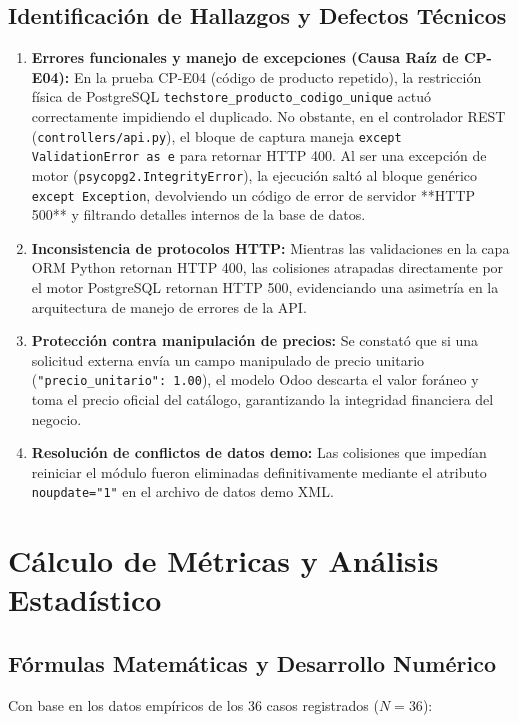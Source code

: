 \documentclass{article}
\begin{document}
\subsection{Identificación de Hallazgos y Defectos Técnicos}
\begin{enumerate}[leftmargin=*]
\item \textbf{Errores funcionales y manejo de excepciones (Causa Raíz de CP-E04):}
En la prueba CP-E04 (código de producto repetido), la restricción física de PostgreSQL \texttt{techstore\_producto\_codigo\_unique} actuó correctamente impidiendo el duplicado. No obstante, en el controlador REST (\texttt{controllers/api.py}), el bloque de captura maneja \texttt{except ValidationError as e} para retornar HTTP 400. Al ser una excepción de motor (\texttt{psycopg2.IntegrityError}), la ejecución saltó al bloque genérico \texttt{except Exception}, devolviendo un código de error de servidor **HTTP 500** y filtrando detalles internos de la base de datos.
\item \textbf{Inconsistencia de protocolos HTTP:}
Mientras las validaciones en la capa ORM Python retornan HTTP 400, las colisiones atrapadas directamente por el motor PostgreSQL retornan HTTP 500, evidenciando una asimetría en la arquitectura de manejo de errores de la API.
\item \textbf{Protección contra manipulación de precios:}
Se constató que si una solicitud externa envía un campo manipulado de precio unitario (\texttt{"precio\_unitario": 1.00}), el modelo Odoo descarta el valor foráneo y toma el precio oficial del catálogo, garantizando la integridad financiera del negocio.
\item \textbf{Resolución de conflictos de datos demo:}
Las colisiones que impedían reiniciar el módulo fueron eliminadas definitivamente mediante el atributo \texttt{noupdate="1"} en el archivo de datos demo XML.
\end{enumerate}

\section{Cálculo de Métricas y Análisis Estadístico}

\subsection{Fórmulas Matemáticas y Desarrollo Numérico}
Con base en los datos empíricos de los 36 casos registrados ($N = 36$):
\end{document}
